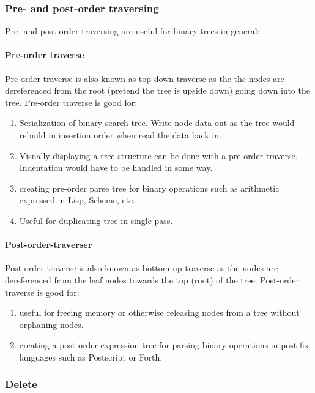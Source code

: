 \documentclass{article}
\begin{document}
\subsubsection{Pre- and post-order traversing}

Pre- and post-order traversing are useful for binary trees in general:

\paragraph{Pre-order traverse}

Pre-order traverse is also known as top-down traverse as the the nodes
are dereferenced from the root (pretend the tree is upside down) going
down into the tree. Pre-order traverse is good for:

\begin{enumerate}
  \item Serialization of binary search tree.
    Write node data out
    as the tree would rebuild in insertion order when read the data back in.
  \item Visually displaying a tree structure can be done with a pre-order traverse.
    Indentation would have to be handled in some way.
  \item creating pre-order parse tree for binary operations such as arithmetic
    expressed in Lisp, Scheme, etc.
  \item Useful for duplicating tree in single pass.
\end{enumerate}

\paragraph{Post-order-traverser}

Post-order traverse is also known as bottom-up traverse as the nodes
are dereferenced from the leaf nodes towards the top (root) of the
tree. Post-order traverse is good for:

\begin{enumerate}
  \item useful for freeing memory or otherwise releasing
    nodes from a tree without orphaning nodes.
  \item creating a post-order expression tree for parsing binary operations
    in post fix languages such as Postscript or Forth.
\end{enumerate}

\subsubsection{Delete}
\end{document}
